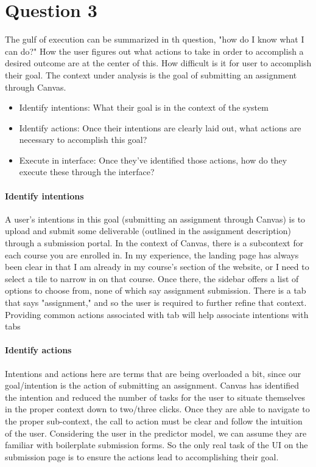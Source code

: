 \section{Question 3}

The gulf of execution can be summarized in th question, "how do I know what I can do?" How the user figures out what actions to take in order to accomplish a desired outcome are at the center of this. How difficult is it for user to accomplish their goal. The context under analysis is the goal of submitting an assignment through Canvas.

\begin{itemize}
\item
Identify intentions: What their goal is in the context of the system
\item
Identify actions: Once their intentions are clearly laid out, what actions are necessary to accomplish this goal?
\item
Execute in interface: Once they've identified those actions, how do they execute these through the interface?
\end{itemize}

\paragraph{Identify intentions}
A user's intentions in this goal (submitting an assignment through Canvas) is to upload and submit some deliverable (outlined in the assignment description) through a submission portal. In the context of Canvas, there is a subcontext for each course you are enrolled in. In my experience, the landing page has always been clear in that I am already in my course's section of the website, or I need to select a tile to narrow in on that course. Once there, the sidebar offers a list of options to choose from, none of which say assignment submission. There is a tab that says "assignment," and so the user is required to further refine that context. Providing common actions associated with tab will help associate intentions with tabs

\paragraph{Identify actions}
Intentions and actions here are terms that are being overloaded a bit, since our goal/intention is the action of submitting an assignment. Canvas has identified the intention and reduced the number of tasks for the user to situate themselves in the proper context down to two/three clicks. Once they are able to navigate to the proper sub-context, the call to action must be clear and follow the intuition of the user. Considering the user in the predictor model, we can assume they are familiar with boilerplate submission forms. So the only real task of the UI on the submission page is to ensure the actions lead to accomplishing their goal.

